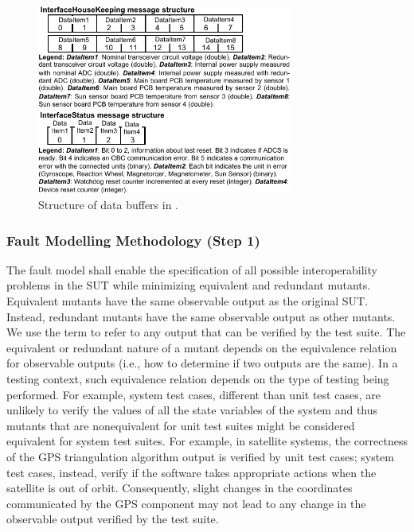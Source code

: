 \begin{figure}
	\centering
		\includegraphics[width=8.4cm]{damat/images/BufferStructuresSmall}
		\caption{Structure of data buffers in \ESAIL.}
		\label{fig:appr:bufferStructure}
	\end{figure}
	
	

\clearpage


\subsubsection{Fault Modelling Methodology (Step 1)}
\label{sec:methodology}



The fault model shall enable the specification of 
all possible interoperability problems in the SUT while minimizing equivalent and redundant mutants.
Equivalent mutants have the same observable output as the original SUT. 
Instead, redundant mutants have the same observable output as other mutants.
We use the term  to refer to any output that can be verified by the test suite.
The equivalent or redundant nature of a mutant depends
on the equivalence relation for observable outputs
(i.e., how to determine if two outputs are the same).
In a testing context, such equivalence relation depends on the type of testing being performed. For example, system test cases, different than unit test cases,  are unlikely to verify the values of all the state variables of the system and thus mutants that are nonequivalent for unit test suites might be considered equivalent for system test suites. 
For example, in satellite systems, the correctness of the GPS triangulation algorithm output is verified by unit test cases; system test cases, instead, verify 
if the software takes appropriate actions when the satellite is out of orbit. Consequently, slight changes in the coordinates communicated by the GPS component may not lead to any change in the observable output verified by the test suite.


